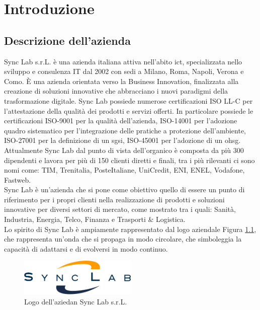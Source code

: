 \chapter{Introduzione}
\label{cap:introduzione}
\section{Descrizione dell'azienda}
Sync Lab s.r.L. è una azienda italiana attiva nell'abito \gls{ict}{}, specializzata nello sviluppo e consulenza IT dal 2002 con sedi a 
Milano, Roma, Napoli, Verona e Como. È una azienda orientata verso la Business Innovation, finalizzata alla 
creazione di soluzioni innovative che abbracciano i nuovi paradigmi della trasformazione digitale.
Sync Lab possiede numerose certificazioni ISO LL-C per l'attestazione della 
qualità dei prodotti e servizi offerti. In particolare possiede le certificazioni 
ISO-9001 per la qualità dell'azienda, ISO-14001 per l'adozione quadro sistematico per l'integrazione delle pratiche a protezione dell'ambiente, ISO-27001 per la definizione di un \gls{sgsi}{}, ISO-45001 per l'adozione di un \gls{ohsg}{}.
\\
Attualmente Sync Lab dal punto di vista dell'organico è composta da più 300 dipendenti e lavora per più di 150 clienti diretti e finali, tra i più rilevanti ci sono nomi come: TIM, Trenitalia, PosteItaliane, UniCredit, ENI, ENEL, Vodafone, Fastweb.
\\
Sync Lab è un'azienda che si pone come obiettivo quello di essere un punto di riferimento per i propri clienti nella realizzazione di prodotti e soluzioni innovative per diversi settori di mercato, come mostrato  tra i quali: Sanità, Industria, Energia, Telco, Finanza e Trasporti \& Logistica.\\
Lo spirito di Sync Lab è ampiamente rappresentato dal logo aziendale Figura \ref{figure:logo_azienda}, che rappresenta un'onda che si propaga in modo circolare, che simboleggia la capacità di adattarsi e di evolversi in modo continuo.\\


\begin{figure}[htbp]  
\centering
    \includegraphics[width=0.5\textwidth]{images/introduzione/logo_azienda.png}
    \caption{Logo dell'aziedan Sync Lab s.r.L.}
    \label{figure:logo_azienda}
\end{figure}
\pagebreak
